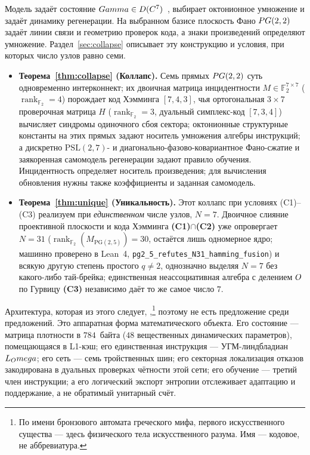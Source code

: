 Модель \TALOS{} задаёт состояние
$Gamma\in D(C^7)$~\cite{uhm2026}, выбирает октонионное умножение
и задаёт динамику регенерации. На выбранном базисе плоскость Фано $PG(2,2)$
задаёт линии связи и геометрию проверок кода, а знаки произведений
определяют умножение. Раздел~\ref{sec:collapse} описывает эту конструкцию
и условия, при которых число узлов равно семи.

\begin{itemize}[leftmargin=1.5em,itemsep=1pt]
  \item \textbf{Теорема~\ref{thm:collapse} (Коллапс).} Семь прямых $PG(2,2)$
        суть одновременно интерконнект; их двоичная матрица инцидентности
        $M\in\mathbb{F}_2^{7\times 7}$ ($\operatorname{rank}_{\mathbb{F}_2}=4$)
        порождает код Хэмминга $[7,4,3]$, чья ортогональная $3\times 7$
        проверочная матрица $H$ ($\operatorname{rank}_{\mathbb{F}_2}=3$,
        дуальный симплекс-код $[7,3,4]$) вычисляет синдромы одиночного сбоя
        сектора; октонионные структурные константы на этих прямых задают
        носитель умножения алгебры инструкций; а дискретно
        $\mathrm{PSL}(2,7)$- и диагонально-фазово-ковариантное Фано-сжатие и
        заякоренная самомодель регенерации задают правило обучения. Инцидентность
        определяет носитель произведения; для вычисления обновления нужны также
        коэффициенты и заданная самомодель.
  \item \textbf{Теорема~\ref{thm:unique} (Уникальность).} Этот коллапс
        при условиях (C1)--(C3) реализуем при \emph{единственном} числе узлов,
        $N=7$. Двоичное слияние проективной плоскости и кода Хэмминга
        \textbf{(C1)}$\cap$\textbf{(C2)} уже опровергает $N=31$
        ($\operatorname{rank}_{\mathbb{F}_2}(M_{\mathrm{PG}(2,5)})=30$,
        остаётся лишь одномерное ядро; машинно проверено в Lean~4,
        \texttt{pg2\_5\_refutes\_N31\_hamming\_fusion}) и всякую другую степень
        простого $q\neq 2$, однозначно выделяя $N=7$ без какого-либо тай-брейка;
        единственная неассоциативная алгебра с делением $O$ по Гурвицу
        \textbf{(C3)} независимо даёт то же самое число $7$.
\end{itemize}

Архитектура, которая из этого следует, \TALOS{},\footnote{По имени бронзового
автомата греческого мифа, первого искусственного существа --- здесь физического
тела искусственного разума. Имя --- кодовое, не аббревиатура.} поэтому не есть
предложение среди предложений. Это аппаратная форма математического объекта.
Его состояние --- матрица плотности в $784$~байта ($48$ вещественных
динамических параметров), помещающаяся в L1-кэш; его единственная инструкция ---
УГМ-линдбладиан $L_Omega$; его сеть --- семь тройственных шин; его секторная
локализация отказов закодирована в дуальных проверках чётности этой сети; его
обучение --- третий член инструкции; а его логический экспорт энтропии
отслеживает адаптацию и поддержание, а не обратимый унитарный счёт.

